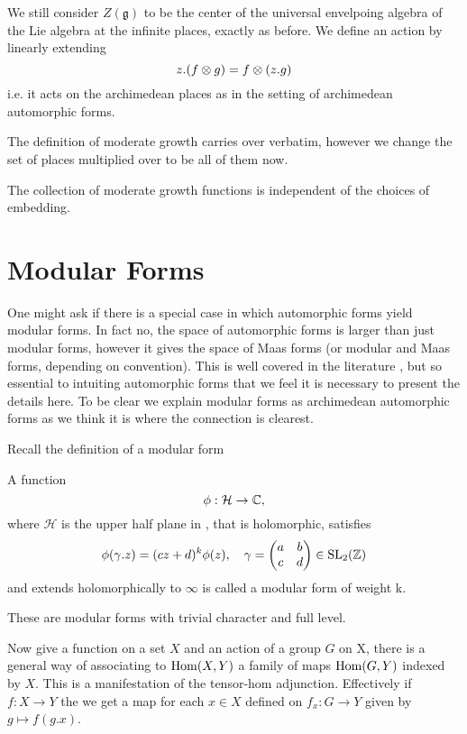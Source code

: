     We still consider \(Z(\mathfrak{g})\) to be the center of the universal envelpoing algebra of the Lie algebra at the infinite places, exactly as before. We define an action by linearly extending
    \[z.(f\otimes g) = f\otimes (z.g)\]
    i.e. it acts on the archimedean places as in the setting of archimedean automorphic forms. 
	
	The definition of moderate growth carries over verbatim, however we change the set of places multiplied over to be all of them now.
    
    \begin{remark}
        The collection of moderate growth functions is independent of the choices of embedding. 
    \end{remark}

\section{Modular Forms}
One might ask if there is a special case in which automorphic forms yield modular forms. In fact no, the space of automorphic forms is larger than just modular forms, however it gives the space of Maas forms (or modular and Maas forms, depending on convention). This is well covered in the literature \cite{emertonCLASSICALMODULARFORMS}\cite[3.2]{bumpAutomorphicFormsRepresentations1997}\cite{booherVIEWINGMODULARFORMS}\cite{garrettTransitionEisensteinSeries2016}, but so essential to intuiting automorphic forms that we feel it is necessary to present the details here. To be clear we explain modular forms as archimedean automorphic forms as we think it is where the connection is clearest. 

	Recall the definition of a modular form 
	\begin{Definition}
		A function
		\[\phi: \mathcal{H} \to \C,\]
		where \(\mathcal{H}\) is the upper half plane in \C, that is holomorphic, satisfies 
		\[\phi(\gamma.z) = (cz+d)^k\phi(z), \quad \gamma = \begin{pmatrix}
			a &b \\
			c &d
		\end{pmatrix}\in \SL_2(\Z)\]
		and extends holomorphically to \(\infty\) is called a modular form of weight k.
	\end{Definition}
	These are modular forms with trivial character and full level.


	Now give a function on a set \(X\) and an action of a group \(G\) on X, there is a general way of associating to \(\operatorname{Hom}(X, Y)\) a family of maps \(\operatorname{Hom}(G, Y)\) indexed by \(X\). This is a manifestation of the tensor-hom adjunction. Effectively if \(f: X\to Y\) the we get a map for each \(x\in X\) defined on \(f_x : G \to Y\) given by \(g\mapsto f(g.x)\).

